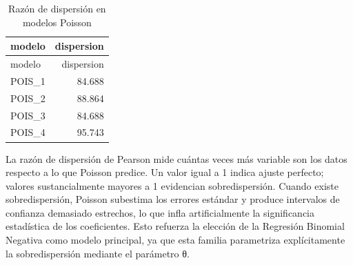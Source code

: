 \documentclass[
]{article}
\newenvironment{Shaded}{\begin{snugshade}}{\end{snugshade}}
\newcommand{\AttributeTok}[1]{\textcolor[rgb]{0.13,0.29,0.53}{#1}}
\newcommand{\ControlFlowTok}[1]{\textcolor[rgb]{0.13,0.29,0.53}{\textbf{#1}}}
\newcommand{\DecValTok}[1]{\textcolor[rgb]{0.00,0.00,0.81}{#1}}
\newcommand{\FunctionTok}[1]{\textcolor[rgb]{0.13,0.29,0.53}{\textbf{#1}}}
\newcommand{\NormalTok}[1]{#1}
\newcommand{\OtherTok}[1]{\textcolor[rgb]{0.56,0.35,0.01}{#1}}
\newcommand{\SpecialCharTok}[1]{\textcolor[rgb]{0.81,0.36,0.00}{\textbf{#1}}}
\newcommand{\StringTok}[1]{\textcolor[rgb]{0.31,0.60,0.02}{#1}}
\begin{document}
\begin{Shaded}
\end{Shaded}

\begin{longtable}[]{@{}lr@{}}
\caption{Razón de dispersión en modelos Poisson}\tabularnewline
\toprule\noalign{}
modelo & dispersion \\
\midrule\noalign{}
\endfirsthead
\toprule\noalign{}
modelo & dispersion \\
\midrule\noalign{}
\endhead
\bottomrule\noalign{}
\endlastfoot
POIS\_1 & 84.688 \\
POIS\_2 & 88.864 \\
POIS\_3 & 84.688 \\
POIS\_4 & 95.743 \\
\end{longtable}

La razón de dispersión de Pearson mide cuántas veces más variable son
los datos respecto a lo que Poisson predice. Un valor igual a 1 indica
ajuste perfecto; valores sustancialmente mayores a 1 evidencian
sobredispersión. Cuando existe sobredispersión, Poisson subestima los
errores estándar y produce intervalos de confianza demasiado estrechos,
lo que infla artificialmente la significancia estadística de los
coeficientes. Esto refuerza la elección de la Regresión Binomial
Negativa como modelo principal, ya que esta familia parametriza
explícitamente la sobredispersión mediante el parámetro θ.
\end{document}
